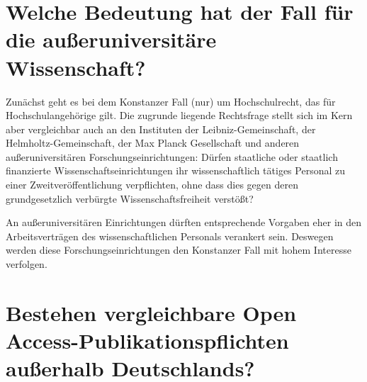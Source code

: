 \documentclass[a4paper,
fontsize=11pt,
oneside,
numbers=noperiodatend,
parskip=half-,
bibliography=totoc,
final
]{scrartcl}
\begin{document}
\hypertarget{welche-bedeutung-hat-der-fall-fuxfcr-die-auuxdferuniversituxe4re-wissenschaft}{%
\section*{Welche Bedeutung hat der Fall für die außeruniversitäre
Wissenschaft?}\label{welche-bedeutung-hat-der-fall-fuxfcr-die-auuxdferuniversituxe4re-wissenschaft}}

Zunächst geht es bei dem Konstanzer Fall (nur) um Hochschulrecht, das
für Hochschulangehörige gilt. Die zugrunde liegende Rechtsfrage stellt
sich im Kern aber vergleichbar auch an den Instituten der
Leibniz-Gemeinschaft, der Helmholtz-Gemeinschaft, der Max Planck
Gesellschaft und anderen außeruniversitären Forschungseinrichtungen:
Dürfen staatliche oder staatlich finanzierte Wissenschaftseinrichtungen
ihr wissenschaftlich tätiges Personal zu einer Zweitveröffentlichung
verpflichten, ohne dass dies gegen deren grundgesetzlich verbürgte
Wissenschaftsfreiheit verstößt?

An außeruniversitären Einrichtungen dürften entsprechende Vorgaben eher
in den Arbeitsverträgen des wissenschaftlichen Personals verankert sein.
Deswegen werden diese Forschungseinrichtungen den Konstanzer Fall mit
hohem Interesse verfolgen.

\hypertarget{bestehen-vergleichbare-open-access-publikationspflichten-auuxdferhalb-deutschlands}{%
\section*{Bestehen vergleichbare Open Access-Publikationspflichten
außerhalb
Deutschlands?}\label{bestehen-vergleichbare-open-access-publikationspflichten-auuxdferhalb-deutschlands}}
\end{document}
